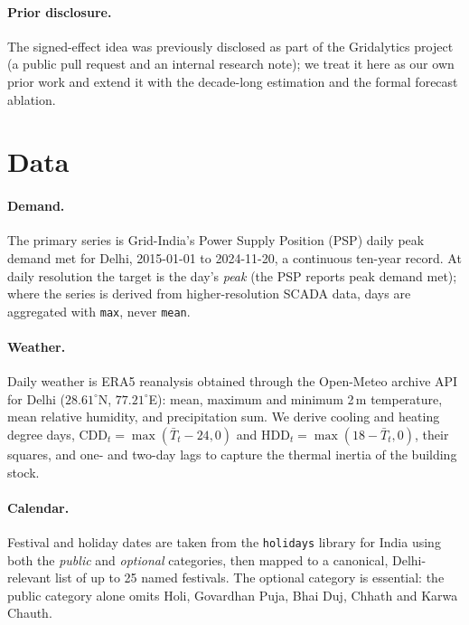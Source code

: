 \documentclass[11pt]{article}
\begin{document}
\paragraph{Prior disclosure.} The signed-effect idea was previously disclosed as
part of the Gridalytics project (a public pull request and an internal research
note); we treat it here as our own prior work and extend it with the
decade-long estimation and the formal forecast ablation.

\section{Data}
\label{sec:data}

\paragraph{Demand.} The primary series is Grid-India's Power Supply Position (PSP)
daily peak demand met for Delhi, 2015-01-01 to 2024-11-20, a continuous
ten-year record. At daily resolution the target is the day's \emph{peak} (the PSP
reports peak demand met); where the series is derived from higher-resolution SCADA
data, days are aggregated with \texttt{max}, never \texttt{mean}.

\paragraph{Weather.} Daily weather is ERA5 reanalysis obtained through the
Open-Meteo archive API for Delhi ($28.61^\circ$N, $77.21^\circ$E): mean, maximum
and minimum 2\,m temperature, mean relative humidity, and precipitation sum. We
derive cooling and heating degree days,
$\mathrm{CDD}_t=\max(\bar T_t-24,0)$ and $\mathrm{HDD}_t=\max(18-\bar T_t,0)$,
their squares, and one- and two-day lags to capture the thermal inertia of the
building stock.

\paragraph{Calendar.} Festival and holiday dates are taken from the
\texttt{holidays} library for India using both the \emph{public} and
\emph{optional} categories, then mapped to a canonical, Delhi-relevant list of up
to 25 named festivals. The optional category is essential: the public category
alone omits Holi, Govardhan Puja, Bhai Duj, Chhath and Karwa Chauth.
\end{document}

